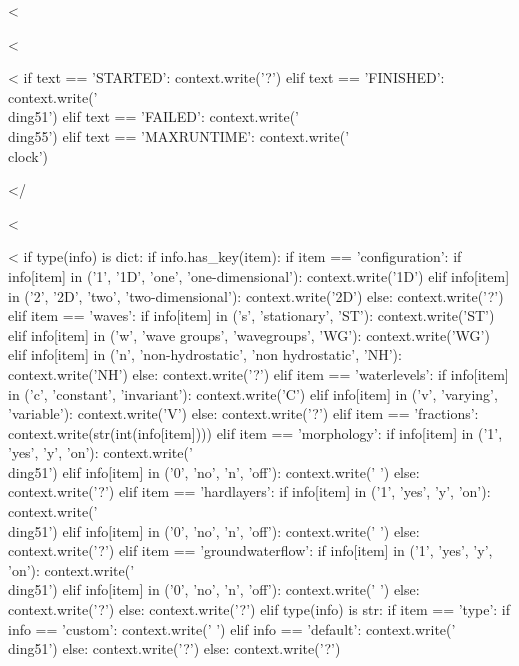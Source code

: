 <%

<%

<%
    if text == 'STARTED':
        context.write('?')
    elif text == 'FINISHED':
        context.write('\\ding{51}')
    elif text == 'FAILED':
        context.write('\\ding{55}')
    elif text == 'MAXRUNTIME':
        context.write('\\clock')

</%

<%

<%
    if type(info) is dict:
        if info.has_key(item):
            if item == 'configuration':
                if info[item] in ('1', '1D', 'one', 'one-dimensional'):
                    context.write('1D')
                elif info[item] in ('2', '2D', 'two', 'two-dimensional'):
                    context.write('2D')
                else:
                    context.write('?')
            elif item == 'waves':
		if info[item] in ('s', 'stationary', 'ST'):
		    context.write('ST')
		elif info[item] in ('w', 'wave groups', 'wavegroups', 'WG'):
                    context.write('WG')
                elif info[item] in ('n', 'non-hydrostatic', 'non hydrostatic', 'NH'):
                    context.write('NH')
                else:
                    context.write('?')
            elif item == 'waterlevels':
                if info[item] in ('c', 'constant', 'invariant'):
                    context.write('C')
                elif info[item] in ('v', 'varying', 'variable'):
                    context.write('V')
                else:
                    context.write('?')
            elif item == 'fractions':
                context.write(str(int(info[item])))
            elif item == 'morphology':
                if info[item] in ('1', 'yes', 'y', 'on'):
                    context.write('\\ding{51}')
                elif info[item] in ('0', 'no', 'n', 'off'):
                    context.write(' ')
                else:
                    context.write('?')
            elif item == 'hardlayers':
                if info[item] in ('1', 'yes', 'y', 'on'):
                    context.write('\\ding{51}')
                elif info[item] in ('0', 'no', 'n', 'off'):
                    context.write(' ')
                else:
                    context.write('?')
            elif item == 'groundwaterflow':
                if info[item] in ('1', 'yes', 'y', 'on'):
                    context.write('\\ding{51}')
                elif info[item] in ('0', 'no', 'n', 'off'):
                    context.write(' ')
                else:
                    context.write('?')
        else:
            context.write('?')
    elif type(info) is str:
        if item == 'type':
            if info == 'custom':
                context.write(' ')
            elif info == 'default':
                context.write('\\ding{51}')
            else:
                context.write('?')
        else:
            context.write('?')

